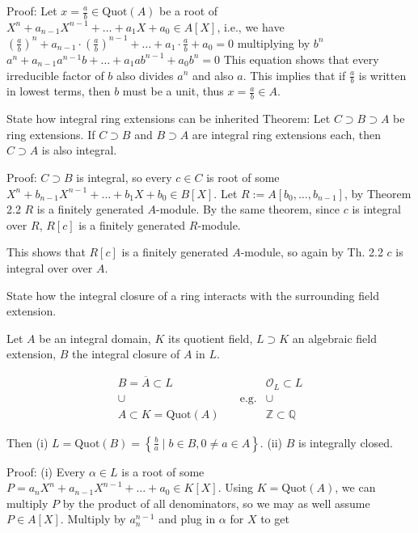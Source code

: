 Proof: 
Let \( x = \frac{a}{b} \in \text{Quot}(A) \) be a root of \( X^n + a_{n-1}X^{n-1} + \dots + a_1X + a_0 \in A[X] \), i.e., we have
\(
\left( \frac{a}{b} \right)^n + a_{n-1} \cdot \left( \frac{a}{b} \right)^{n-1} + \dots + a_1 \cdot \frac{a}{b} + a_0 = 0
\)
multiplying by \( b^n \)
\(
a^n + a_{n-1} a^{n-1} b + \dots + a_1 a b^{n-1} + a_0 b^n = 0
\)
This equation shows that every irreducible factor of \( b \) also divides \( a^n \) and also \( a \). 
This implies that if \( \frac{a}{b} \) is written in lowest terms, then \( b \) must be a unit, thus \( x = \frac{a}{b} \in A \).

State how integral ring extensions can be inherited 
Theorem:
Let \( C \supset B \supset A \) be ring extensions. If \( C \supset B \) and \( B \supset A \) are integral ring extensions each, then \( C \supset A \) is also integral.

Proof: 
\( C \supset B \) is integral, so every \( c \in C \) is root of some \( X^n + b_{n-1}X^{n-1} + \dots + b_1X + b_0 \in B[X] \). 
Let \( R := A[b_0, \dots, b_{n-1}] \), by Theorem 2.2 \( R \) is a finitely generated \( A \)-module. 
By the same theorem, since \( c \) is integral over \( R \), \( R[c] \) is a finitely generated \( R \)-module.

This shows that \( R[c] \) is a finitely generated \( A \)-module, so again by Th. 2.2 \( c \) is integral over over \( A \).

State how the integral closure of a ring interacts with the surrounding field extension.

Let \( A \) be an integral domain, \( K \) its quotient field, \( L \supset K \) an algebraic field extension, 
\( B \) the integral closure of \( A \) in \( L \).

\[
\begin{array}{ccc}
B = \overline{A} \subset L & & \mathcal{O}_L \subset L \\
\cup & \quad \text{e.g.} & \cup \\
A \subset K = \text{Quot}(A) & & \mathbb{Z} \subset \mathbb{Q}
\end{array}
\]

Then 
(i) \( L = \text{Quot}(B) = \left\{ \frac{b}{a} \mid b \in B, 0 \neq a \in A \right\} \).
(ii) \( B \) is integrally closed.

Proof: 
(i) Every \( \alpha \in L \) is a root of some \( P = a_n X^n + a_{n-1} X^{n-1} + \ldots + a_0 \in K[X] \). Using \( K = \text{Quot}(A) \), we can multiply \( P \) by the product of all denominators, so we may as well assume \( P \in A[X] \). Multiply by \( a_n^{n-1} \) and plug in \( \alpha \) for \( X \) to get

